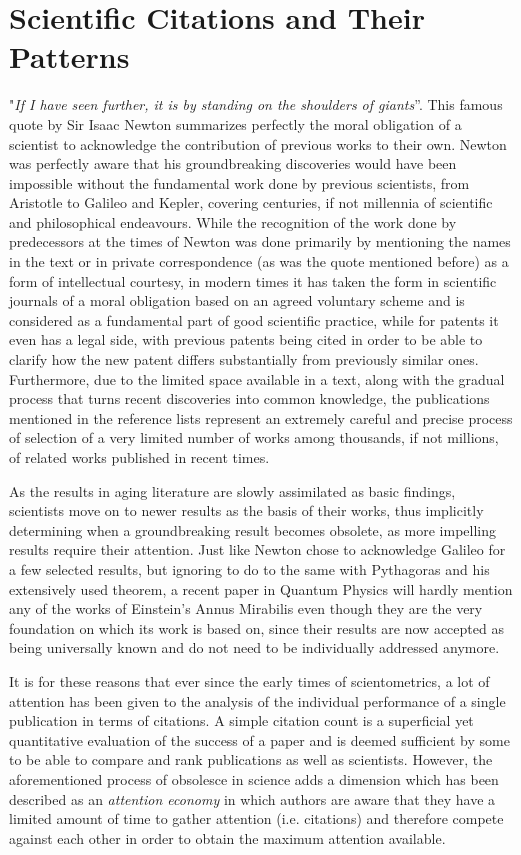 \chapter{Scientific Citations and Their Patterns}\label{Scientific Citations and Their Patterns}
"\textit{If I have seen further, it is by standing on the shoulders of giants}''. This famous quote by Sir Isaac Newton summarizes perfectly the
moral obligation of a scientist to acknowledge the contribution of previous works to their own. Newton was perfectly aware that his
groundbreaking discoveries would have been impossible without the fundamental work done by previous scientists, from Aristotle to Galileo 
and Kepler, covering  centuries, if not millennia of scientific and philosophical endeavours.
While the recognition of the work done by predecessors at the times of Newton was done primarily by mentioning the names in the text or in private correspondence (as was the quote mentioned before) as a form of intellectual courtesy,
in modern times it has taken the form in scientific journals of a moral obligation based on an agreed voluntary scheme and is considered as a fundamental part of good scientific practice,
while for patents it even has a legal side, with previous patents being cited in order to be able to clarify how the new patent differs substantially from previously similar ones.
 Furthermore, due to the limited space available in a text, along 
  with the gradual process that turns recent discoveries into common knowledge, the publications mentioned in the reference lists represent
  an extremely careful and precise process of selection of a very limited number of works among thousands, if not millions, of related works published
  in recent times.
  
  As the results in aging literature are slowly assimilated as basic findings, scientists move on to newer results as the basis of their works,
  thus implicitly determining when a groundbreaking result becomes obsolete, as more impelling results require their attention. Just like Newton chose to acknowledge
  Galileo for a few selected results, but ignoring to do to the same with Pythagoras and his extensively used theorem, a recent paper in Quantum Physics will hardly
  mention any of the works of Einstein's Annus Mirabilis even though they are the very foundation on which its work is based on, since their results are now
  accepted as being universally known and do not need to be individually addressed anymore. 
  
It is for these reasons that ever since the early times of scientometrics, a lot of attention has been given to the analysis of the individual performance of
a single publication in terms of citations. A simple citation count is a superficial yet quantitative evaluation of the success of a paper and is deemed sufficient by some
to be able to compare and rank publications as well as scientists. However, the aforementioned process of obsolesce in science adds a dimension which has been described as
an \textit{attention economy} \cite{klamer_attention_2002} in which authors are aware that they have a limited amount of time to gather attention (i.e. citations)
and therefore compete against each other in order to obtain the maximum attention available. 

